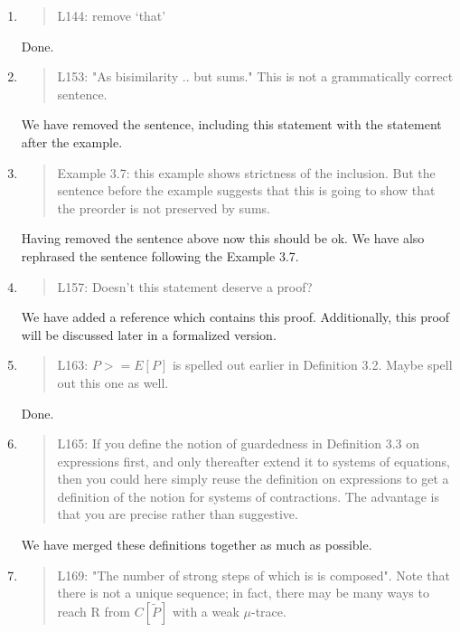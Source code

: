 \begin{enumerate}
\item \begin{quote}
    L144: remove ‘that’
  \end{quote}
  Done.
  
\item \begin{quote}
    L153: "As bisimilarity .. but sums." This is not a grammatically correct sentence.
  \end{quote}

  We have removed the sentence, including this statement with the
  statement after the example.
  
\item \begin{quote}
    Example 3.7: this example shows strictness of the inclusion. But
    the sentence before the example suggests that this is going to
    show that the preorder is not preserved by sums.
  \end{quote}

  Having removed the sentence above now this should be ok. We have
  also rephrased the sentence following the Example 3.7.
  
\item \begin{quote}
    L157: Doesn’t this statement deserve a proof?
  \end{quote}
  We have added a reference which contains this proof. Additionally,
  this proof will be discussed later in a formalized version.
  
\item \begin{quote}
    L163: $P >= E[P]$ is spelled out earlier in Definition 3.2. Maybe spell out this one as well.
  \end{quote}

  Done.

\item \begin{quote}
    L165: If you define the notion of guardedness in Definition 3.3 on
    expressions first, and only thereafter extend it to systems of
    equations, then you could here simply reuse the definition on
    expressions to get a definition of the notion for systems of
    contractions. The advantage is that you are precise rather than
    suggestive.
  \end{quote}

  We have merged these definitions together as much as possible.

\item \begin{quote}
    L169: "The number of strong steps of which is is composed". Note
    that there is not a unique sequence; in fact, there may be many
    ways to reach R from $C[\tilde{P}]$ with a weak $\mu$-trace.
  \end{quote}


\end{enumerate}
